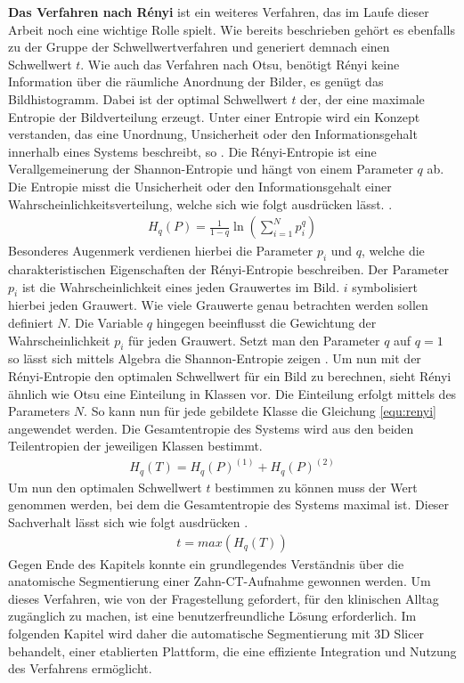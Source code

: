 \textbf{Das Verfahren nach Rényi} ist ein weiteres Verfahren, das im Laufe dieser
Arbeit noch eine wichtige Rolle spielt. Wie bereits beschrieben gehört es
ebenfalls zu der Gruppe der Schwellwertverfahren und generiert demnach einen
Schwellwert $t$. Wie auch das Verfahren nach Otsu, benötigt Rényi keine
Information über die räumliche Anordnung der Bilder, es genügt das Bildhistogramm.
Dabei ist der optimal Schwellwert $t$ der, der eine maximale Entropie der Bildverteilung
erzeugt. Unter einer Entropie wird ein Konzept verstanden, das eine Unordnung,
Unsicherheit oder den Informationsgehalt innerhalb eines Systems beschreibt, so \citet[S.~102]{bein2006}.
Die Rényi-Entropie ist eine Verallgemeinerung der Shannon-Entropie und hängt von
einem Parameter $q$ ab. Die Entropie misst die Unsicherheit oder den
Informationsgehalt einer Wahrscheinlichkeitsverteilung, welche sich wie folgt ausdrücken
lässt. \citep[vgl.][K.~2]{bromiley2004}.
\begin{align}
	\label{equ:renyi}H_{q}(P) = \frac{1}{1-q}\ln \left( \sum_{i=1}^{N}p_{i}^{q}\right)
\end{align}
Besonderes Augenmerk verdienen hierbei die Parameter $p_{i}$ und $q$, welche die
charakteristischen Eigenschaften der Rényi-Entropie beschreiben. Der Parameter
$p_{i}$ ist die Wahrscheinlichkeit eines jeden Grauwertes im Bild. $i$ symbolisiert
hierbei jeden Grauwert. Wie viele Grauwerte genau betrachten werden sollen
definiert $N$. Die Variable $q$ hingegen beeinflusst die Gewichtung der Wahrscheinlichkeit
$p_{i}$ für jeden Grauwert. Setzt man den Parameter $q$ auf $q = 1$ so lässt
sich mittels Algebra die Shannon-Entropie zeigen \citep[vgl.][K.~2]{bromiley2004}.
Um nun mit der Rényi-Entropie den optimalen Schwellwert für ein Bild zu
berechnen, sieht Rényi ähnlich wie Otsu eine Einteilung in Klassen vor. Die
Einteilung erfolgt mittels des Parameters $N$. So kann nun für jede gebildete Klasse
die Gleichung \ref{equ:renyi} angewendet werden. Die Gesamtentropie des Systems
wird aus den beiden Teilentropien der jeweiligen Klassen bestimmt\citep[vgl.][K.~2]{bromiley2004}.
\begin{align}
	H_{q}(T) = H_{q}(P)^{(1)}+ H_{q}(P)^{(2)}
\end{align}
Um nun den optimalen Schwellwert $t$ bestimmen zu können muss der Wert genommen werden,
bei dem die Gesamtentropie des Systems maximal ist. Dieser Sachverhalt lässt sich
wie folgt ausdrücken \citep[vgl.][K.~2]{bromiley2004}.
\begin{align}
	t = max(H_{q}(T))
\end{align}
Gegen Ende des Kapitels konnte ein grundlegendes Verständnis über die anatomische
Segmentierung einer Zahn-\ac{CT}-Aufnahme gewonnen werden. Um dieses Verfahren,
wie von der Fragestellung gefordert, für den klinischen Alltag zugänglich zu machen,
ist eine benutzerfreundliche Lösung erforderlich. Im folgenden Kapitel wird daher
die automatische Segmentierung mit 3D Slicer behandelt, einer etablierten
Plattform, die eine effiziente Integration und Nutzung des Verfahrens ermöglicht.
